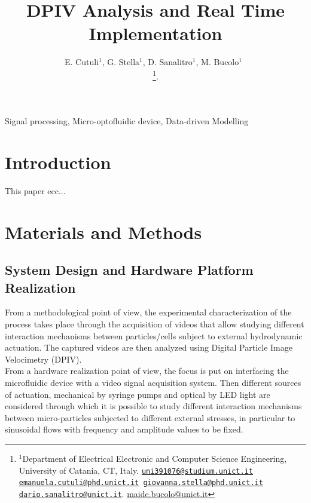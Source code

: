 \documentclass[journal]{IEEEtran}
\title{DPIV Analysis and Real Time Implementation}
\author{E. Cutuli${^{1}}$, G. Stella${^{1}}$, D. Sanalitro${^{1}}$, M. Bucolo${^{1}}$~\IEEEmembership{Senior Member,~IEEE}

\thanks{$^1$Department of Electrical Electronic and Computer Science Engineering, University of Catania, CT, Italy. {\tt \scriptsize\href{mailto:uni391076@studium.unict.it}{\mbox{uni391076@studium.unict.it}}
\scriptsize\href{mailto:emaunuela.cutuli@phd.unict.it}{\mbox{emanuela.cutuli@phd.unict.it}}
\scriptsize\href{mailto:giovanna.stella@phd.unict.it}{\mbox{giovanna.stella@phd.unict.it}}
\scriptsize\href{mailto:dario.sanalitro@unict.it}{\mbox{dario.sanalitro@unict.it}}}. 
\scriptsize\href{mailto:maide.bucolo@unict.it}{\mbox{maide.bucolo@unict.it}}}. 
}
\theoremstyle{definition}
\theoremstyle{remark}
\begin{document}


\maketitle

\begin{abstract}

\end{abstract}

\begin{IEEEkeywords}
	Signal processing, Micro-optofluidic device, Data-driven Modelling
\end{IEEEkeywords}

\section{Introduction}

This paper ecc...



\section{Materials and Methods}

\subsection{System Design and Hardware Platform Realization}\label{sec:design}

From a methodological point of view, the experimental characterization of the process takes place through the acquisition of videos that allow studying different interaction mechanisms between particles/cells subject to external hydrodynamic actuation.
The captured videos are then analyzed using Digital Particle Image Velocimetry (DPIV).
\\From a hardware realization point of view, the focus is put on interfacing the microfluidic device with a video signal acquisition system.
Then different sources of actuation, mechanical by syringe pumps and optical by LED light are considered through which it is possible to study different interaction mechanisms between micro-particles subjected to different external stresses, in particular to sinusoidal flows with frequency and amplitude values to be fixed. 
\end{document}
